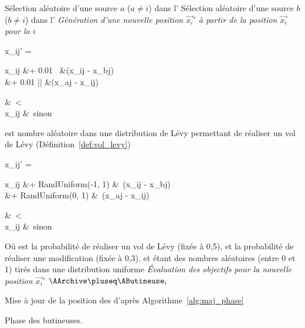 \begin{algorithm}\label{alg:employed_phase}
  \SetAlgoVlined
  \DontPrintSemicolon
  {
    Sélection aléatoire d’une source $a$ ($a \neq i$) dans l’\AArchive\;
    Sélection aléatoire d’une source $b$ ($b \neq i$) dans l’\AHive\;
    \BlankLine
     \emph{Génération d’une nouvelle position $\vec{x_{i}}'$ à partir de la %
                       position $\vec{x_{i}}$ pour la \AButineuse $i$}\;
    \If{$\ATirageA < \ARatio $ }
      {
      {
      \begin{algomathdisplay}
        x_{ij}' =%
          \begin{cases}
            \begin{aligned}
              x_{ij}  &+ 0.01 \times ~\ALevy  &\times (x_{ij} - x_{bj})  \\
                      &+ 0.01 \times |\ALevy|   &\times (x_{aj} - x_{ij})  \\
            \end{aligned} &\ \ATirageB < \AMR \\
            x_{ij}        &\ sinon
          \end{cases}
      \end{algomathdisplay}
      \ALevy est nombre aléatoire dans une distribution de Lévy
      permettant de réaliser un vol de Lévy (Définition~\ref{def:vol_levy})\;
      }
      }
    \Else
      {
      {
      \begin{algomathdisplay}
        x_{ij}' =%
          \begin{cases}
            \begin{aligned}
              x_{ij}  &+ RandUniform(-1, 1)   &\times \ (x_{ij} - x_{bj})  \\
                      &+ RandUniform(0, 1)    &\times \ (x_{aj} - x_{ij})  \\
            \end{aligned} &\ \ATirageB < \AMR \\
            x_{ij}        &\ sinon
          \end{cases}
      \end{algomathdisplay}
      }
      }
      Où \ARatio est la probabilité de réaliser un vol de Lévy (fixée à 0,5), et \AMR la probabilité
      de réaliser une modification (fixée à 0,3). \ATirageA et \ATirageB étant des nombres aléatoires
      (entre 0 et 1) tirés dans une distribution uniforme\;
      \BlankLine
     \emph{Évaluation des objectifs pour la nouvelle position $\vec{x_{i}}'$}\;
    {
      $\AArchive \pluseq \AButineuse_{i}$\;
    }
  }
  Mise à jour de la position des \ASources d’après Algorithme~\ref{alg:maj_phase}\;
  \caption{Phase des butineuses.}
\end{algorithm}


